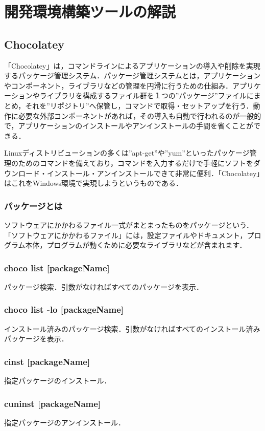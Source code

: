 \chapter{開発環境構築ツールの解説}

\section{Chocolatey}
「Chocolatey」は，コマンドラインによるアプリケーションの導入や削除を実現するパッケージ管理システム．パッケージ管理システムとは，アプリケーションやコンポーネント，ライブラリなどの管理を円滑に行うための仕組み．アプリケーションやライブラリを構成するファイル群を１つの”パッケージ”ファイルにまとめ，それを”リポジトリ”へ保管し，コマンドで取得・セットアップを行う．動作に必要な外部コンポーネントがあれば，その導入も自動で行われるのが一般的で，アプリケーションのインストールやアンインストールの手間を省くことができる．

Linuxディストリビューションの多くは”apt-get”や”yum”といったパッケージ管理のためのコマンドを備えており，コマンドを入力するだけで手軽にソフトをダウンロード・インストール・アンインストールできて非常に便利．「Chocolatey」はこれをWindows環境で実現しようというものである．



\subsection{パッケージとは}
ソフトウェアにかかわるファイル一式がまとまったものをパッケージという．「ソフトウェアにかかわるファイル」には，設定ファイルやドキュメント，プログラム本体，プログラムが動くために必要なライブラリなどが含まれます．

\subsection{choco list [packageName]}
 パッケージ検索．引数がなければすべてのパッケージを表示．
\subsection{choco list -lo [packageName] }
インストール済みのパッケージ検索．引数がなければすべてのインストール済みパッケージを表示．
\subsection{cinst [packageName]}
 指定パッケージのインストール．
\subsection{cuninst [packageName]}
 指定パッケージのアンインストール．
